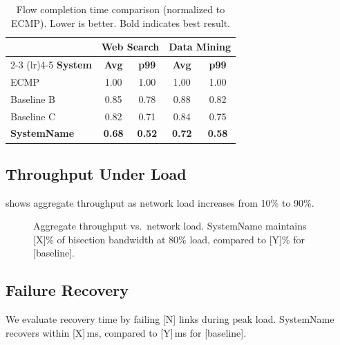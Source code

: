 \documentclass[letterpaper,twocolumn,10pt]{article}
\newcommand{\system}{SystemName\xspace}
\newcommand{\ms}{\,ms\xspace}
\begin{document}
\begin{table}[t]
  \caption{Flow completion time comparison (normalized to ECMP).
    Lower is better. Bold indicates best result.}
  \label{tab:fct}
  \centering
  \begin{small}
  \begin{tabular}{@{}lcccc@{}}
    \toprule
    & \multicolumn{2}{c}{\textbf{Web Search}} &
      \multicolumn{2}{c}{\textbf{Data Mining}} \\
    \cmidrule(lr){2-3} \cmidrule(lr){4-5}
    \textbf{System} & \textbf{Avg} & \textbf{p99} &
    \textbf{Avg} & \textbf{p99} \\
    \midrule
    ECMP             & 1.00          & 1.00          & 1.00 & 1.00 \\
    Baseline B       & 0.85          & 0.78          & 0.88 & 0.82 \\
    Baseline C       & 0.82          & 0.71          & 0.84 & 0.75 \\
    \textbf{\system} & \textbf{0.68} & \textbf{0.52} & \textbf{0.72} & \textbf{0.58} \\
    \bottomrule
  \end{tabular}
  \end{small}
\end{table}

\subsection{Throughput Under Load}
\label{sec:eval:throughput}

 shows aggregate throughput as network load
increases from 10\% to 90\%.

\begin{figure}[t]
  \centering
  \caption{Aggregate throughput vs.\ network load. \system maintains
    [X]\% of bisection bandwidth at 80\% load, compared to
    [Y]\% for [baseline].}
  \label{fig:throughput}
\end{figure}

\subsection{Failure Recovery}
\label{sec:eval:failure}

We evaluate recovery time by failing [N] links during peak load.
\system recovers within [X]\ms, compared to [Y]\ms for [baseline].
\end{document}
